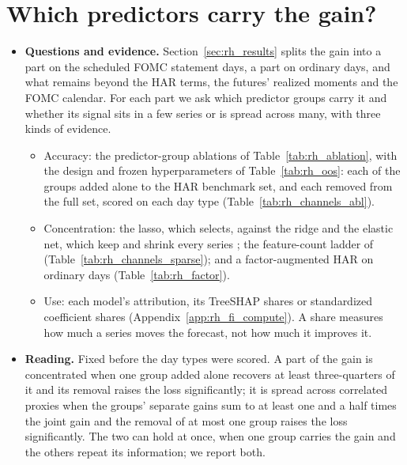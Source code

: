\section{Which predictors carry the gain?}
\label{sec:rh_fi}
\label{sec:rh_results_ablation}
\begin{itemize}
\item \textbf{Questions and evidence.} Section~\ref{sec:rh_results} splits the gain into a part on the scheduled FOMC
  statement days, a part on ordinary days, and what remains beyond the HAR terms, the futures' realized moments and the
  FOMC calendar. For each part we ask which predictor groups carry it and whether its signal sits in a few series or
  is spread across many, with three kinds of evidence.
  \begin{itemize}
  \item Accuracy: the predictor-group ablations of Table~\ref{tab:rh_ablation}, with the design and frozen
    hyperparameters of Table~\ref{tab:rh_oos}: each of the \rhfiNBuckets{} groups added alone to the HAR benchmark
    set, and each removed from the full set, scored on each day type (Table~\ref{tab:rh_channels_abl}).
  \item Concentration: the lasso, which selects, against the ridge and the elastic net, which keep and shrink every
    series \citep[see][]{GiannoneLenzaPrimiceri2021}; the feature-count ladder of
    \citet{MaischZhangUlrichZimmer2026} (Table~\ref{tab:rh_channels_sparse}); and a factor-augmented HAR
    \citep{StockWatson2002,KellyPruitt2015} on ordinary days (Table~\ref{tab:rh_factor}).
  \item Use: each model's attribution, its TreeSHAP shares \citep{lundberg2020local} or standardized coefficient
    shares (Appendix~\ref{app:rh_fi_compute}). A share measures how much a series moves the forecast, not how much it
    improves it.
  \end{itemize}
\item \textbf{Reading.} Fixed before the day types were scored. A part of the gain is concentrated when one group added
  alone recovers at least three-quarters of it and its removal raises the loss significantly; it is spread across
  correlated proxies when the groups' separate gains sum to at least one and a half times the joint gain and the
  removal of at most one group raises the loss significantly. The two can hold at once, when one group carries the
  gain and the others repeat its information; we report both.
\end{itemize}

